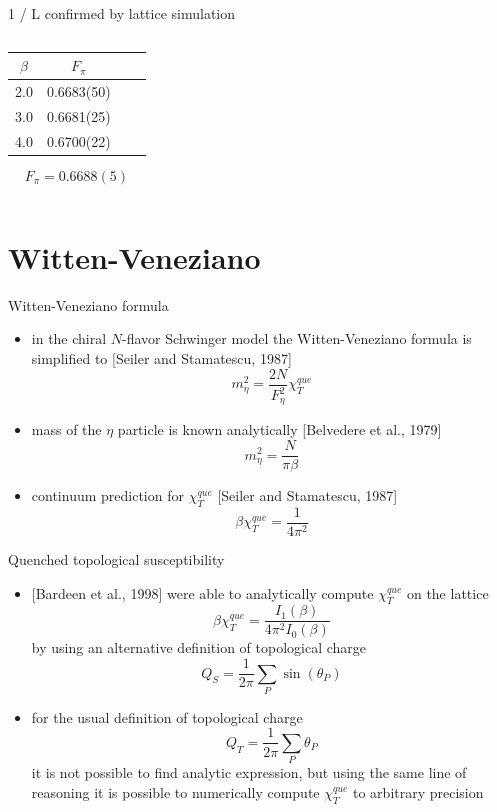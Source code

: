 \documentclass[english]{beamer}
\begin{document}
\begin{frame}{1 / L confirmed by lattice simulation}
\begin{columns}[t]
      \begin{center} 
	    \begin{tabular}{c c c c}
	      $\beta$ & $F_\pi$ \\
	      \hline
	      2.0 & 0.6683(50) \\
	      \hline
	      3.0 & 0.6681(25) \\
	      \hline
	      4.0 & 0.6700(22) \\
	    \end{tabular}
        \[
      	  F_\pi = 0.6688(5)
        \]
      \end{center}	 
  \end{columns}
\end{frame}


\section{Witten-Veneziano}

\begin{frame}{Witten-Veneziano formula}
  \begin{itemize}
    \item in the chiral $N$-flavor Schwinger model the
      Witten-Veneziano formula is simplified to [Seiler and
      Stamatescu, 1987]
      \[
        m_\eta^2 = \frac{2N}{F_\eta^2}\chi_T^{que}
      \]
    \item mass of the $\eta$ particle is known analytically
      [Belvedere et al., 1979] 
      \[
        m_\eta^2 = \frac{N}{\pi\beta}
      \]
    \item continuum prediction for $\chi_T^{que}$
      [Seiler and Stamatescu, 1987]
      \[
        \beta\chi_T^{que} = \frac{1}{4\pi^2}
      \]
  \end{itemize}
\end{frame}

\begin{frame}{Quenched topological susceptibility}
  \begin{itemize}
    \item {[Bardeen et al., 1998]} were able to analytically
      compute $\chi_T^{que}$ on the lattice
      \[
        \beta\chi_T^{que} = \frac{I_1(\beta)}{4 \pi^2 I_0(\beta)}
      \]
      by using an alternative definition of topological charge
      \[
        Q_S = \frac{1}{2\pi}\sum_{P}\sin(\theta_P)
      \]
    \item for the usual definition of topological charge
      \[
        Q_T = \frac{1}{2\pi}\sum_{P}\theta_P
      \]
      it is not possible to find analytic expression, but using the 
      same line of reasoning it is possible to numerically compute
      $\chi_T^{que}$ to arbitrary precision
  \end{itemize}
\end{frame}
\end{document}
